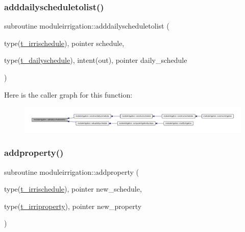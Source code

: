 \subsubsection{\texorpdfstring{adddailyscheduletolist()}{adddailyscheduletolist()}}
{\footnotesize\ttfamily subroutine moduleirrigation\+::adddailyscheduletolist (\begin{DoxyParamCaption}\item[{type(\mbox{\hyperlink{structmoduleirrigation_1_1t__irrischedule}{t\+\_\+irrischedule}}), pointer}]{schedule,  }\item[{type(\mbox{\hyperlink{structmoduleirrigation_1_1t__dailyschedule}{t\+\_\+dailyschedule}}), intent(out), pointer}]{daily\+\_\+schedule }\end{DoxyParamCaption})\hspace{0.3cm}{\ttfamily [private]}}

Here is the caller graph for this function\+:\nopagebreak
\begin{figure}[H]
\begin{center}
\leavevmode
\includegraphics[width=350pt]{namespacemoduleirrigation_acc9d2d1967203bbf775af6570c0abd70_icgraph}
\end{center}
\end{figure}
\mbox{\label{namespacemoduleirrigation_a992b40277b2c8bae0924d2f8aa1534ec}} 
\subsubsection{\texorpdfstring{addproperty()}{addproperty()}}
{\footnotesize\ttfamily subroutine moduleirrigation\+::addproperty (\begin{DoxyParamCaption}\item[{type(\mbox{\hyperlink{structmoduleirrigation_1_1t__irrischedule}{t\+\_\+irrischedule}}), pointer}]{new\+\_\+schedule,  }\item[{type(\mbox{\hyperlink{structmoduleirrigation_1_1t__irriproperty}{t\+\_\+irriproperty}}), pointer}]{new\+\_\+property }\end{DoxyParamCaption})\hspace{0.3cm}{\ttfamily [private]}}

